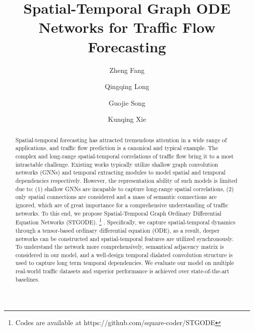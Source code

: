 \documentclass[sigconf]{acmart}
\theoremstyle{definition}
\begin{document}
\fancyhead{}

\title{Spatial-Temporal Graph ODE Networks for Traffic Flow Forecasting}

\author{Zheng Fang}
 
\author{Qingqing Long}
 \authornotemark[1]
 

\author{Guojie Song}

\author{Kunqing Xie}


\begin{abstract}
Spatial-temporal forecasting has attracted tremendous attention in a wide range of applications, and traffic flow prediction is a canonical and typical example. The complex and long-range spatial-temporal correlations of traffic flow bring it to a most intractable challenge. Existing works typically utilize shallow graph convolution networks (GNNs) and temporal extracting modules to model spatial and temporal dependencies respectively. However, the representation ability of such models is limited due to: (1) shallow GNNs are incapable to capture long-range spatial correlations, (2) only spatial connections are  considered and a mass of semantic connections are ignored, which are of great importance for a comprehensive understanding of traffic networks. To this end, we propose Spatial-Temporal Graph Ordinary Differential Equation Networks (STGODE).
\footnote{Codes are available at https://github.com/square-coder/STGODE} .
Specifically, we capture spatial-temporal dynamics through a tensor-based ordinary differential equation (ODE), as a result, deeper networks can be constructed and spatial-temporal features are utilized synchronously. To understand the network more comprehensively, semantical adjacency matrix is considered in our model, and a well-design temporal dialated convolution structure is used to capture long term temporal dependencies. We evaluate our model on multiple real-world traffic datasets and superior 
performance is achieved over state-of-the-art baselines.
\end{abstract}
\end{document}
